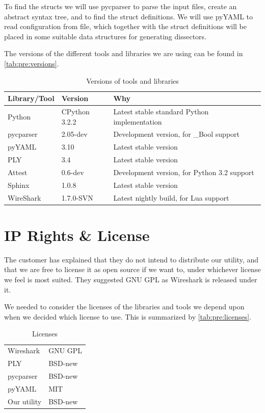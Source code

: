 To find the structs we will use pycparser to parse the input files, create an
abstract syntax tree, and to find the struct definitions. We will use pyYAML to
read configuration from file, which together with the struct definitions will
be placed in some suitable data structures for generating dissectors.

The versions of the different tools and libraries we are using can be found in
\autoref{tab:pre:versions}.
\begin{table}[!h] \footnotesize \center
\vspace{-10pt}
\caption{Versions of tools and libraries\label{tab:pre:versions}}
\begin{tabular}{l l l}
	\toprule
	Library/Tool & Version & Why \\
	\midrule
	Python & CPython 3.2.2 & Latest stable standard Python implementation \\
	pycparser & 2.05-dev & Development version, for \_Bool support \\
	pyYAML & 3.10 & Latest stable version \\
	PLY & 3.4 & Latest stable version \\
	Attest & 0.6-dev & Development version, for Python 3.2 support \\
	Sphinx & 1.0.8 & Latest stable version \\
	WireShark & 1.7.0-SVN & Latest nightly build, for Lua support \\
	\bottomrule
\end{tabular}
\vspace{-10pt}
\end{table}


\section{IP Rights \& License}
\label{sec:pre:license}
The customer has explained that they do not intend to distribute our utility,
and that we are free to license it as open source if we want to, under
whichever license we feel is most suited. They suggested GNU GPL as Wireshark
is released under it.

We needed to consider the licenses of the libraries and tools we depend upon
when we decided which license to use. This is summarized by
\autoref{tab:pre:licenses}.
\begin{table}[!h] \footnotesize \center
\vspace{-20pt}
\caption{Licenses\label{tab:pre:licenses}}
\begin{tabular}{l l}
	\toprule
	Wireshark & GNU GPL \\
	PLY & BSD-new \\
	pycparser & BSD-new \\
	pyYAML & MIT \\
	\midrule
	Our utility & BSD-new \\
	\bottomrule
\end{tabular}
\vspace{-10pt}
\end{table}

